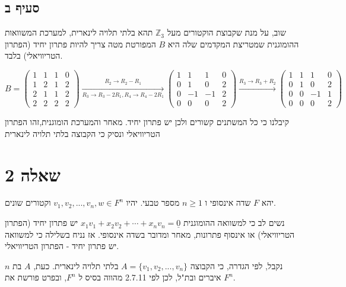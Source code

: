 \documentclass{article}
\begin{document}
\subsection*{סעיף ב}

שוב, על מנת שקבוצת הוקטורים מעל $\mathbb{Z}_3$ תהא בלתי תלויה לינארית, למערכת המשוואות ההומוגנית שמטריצת המקדמים שלה היא $B$ המפורטת מטה צריך להיות פתרון יחיד (הפתרון הטריוויאלי) בלבד.

\[
    B = \begin{pmatrix}
        1 & 1 & 1 & 0 \\
        1 & 2 & 1 & 2 \\
        2 & 1 & 1 & 2 \\
        2 & 2 & 2 & 2
    \end{pmatrix}
    \xrightarrow[R_3\rightarrow R_3-2R_1, R_4\rightarrow R_4-2R_1]{R_2\rightarrow R_2-R_1}
    \begin{pmatrix}
        1 & 1  & 1  & 0 \\
        0 & 1  & 0  & 2 \\
        0 & -1 & -1 & 2 \\
        0 & 0  & 0  & 2
    \end{pmatrix}
    \xrightarrow{R_3\rightarrow R_3+R_2}
    \begin{pmatrix}
        1 & 1 & 1  & 0 \\
        0 & 1 & 0  & 2 \\
        0 & 0 & -1 & 1 \\
        0 & 0 & 0  & 2
    \end{pmatrix}
\]

קיבלנו כי כל המשתנים קשורים ולכן יש פתרון יחיד. מאחר והמערכת הומוגנית,זהו הפתרון הטריוויאלי ונסיק כי הקבוצה בלתי תלויה לינארית

\section*{שאלה 2}

יהא $F$
שדה אינסופי ו
$n\geq 1$
מספר טבעי.
יהיו
$v_1, v_2, ..., v_n, w\in F^n$
וקטורים שונים.

נשים לב כי למשוואה ההומוגנית
$x_1v_1+x_2v_2+\cdots+x_nv_n=\underline{0}$
יש פתרון יחיד (הפתרון הטריוויאלי) או אינסוף פתרונות, מאחר ומדובר בשדה אינסופי.
אז נניח בשלילה כי למשוואה יש פתרון יחיד - הפתרון הטריוויאלי.

נקבל, לפי הגדרה, כי הקבוצה
$A=\{ v_1, v_2, ..., v_n \}$
בלתי תלויה לינארית.
כעת, $A$
בת $n$
איברים ובת"ל, לכן לפי 2.7.11
מהווה בסיס ל $F^n$,
ובפרט פורשת את $F^n$.
\end{document}
